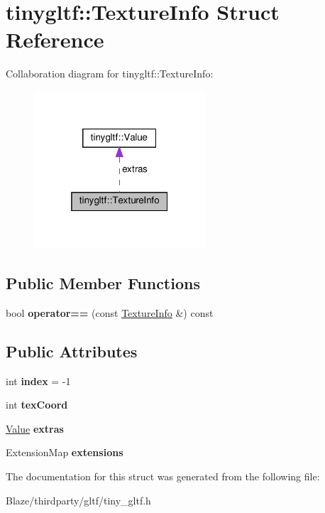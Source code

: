 \hypertarget{structtinygltf_1_1TextureInfo}{}\section{tinygltf\+:\+:Texture\+Info Struct Reference}
\label{structtinygltf_1_1TextureInfo}


Collaboration diagram for tinygltf\+:\+:Texture\+Info\+:\nopagebreak
\begin{figure}[H]
\begin{center}
\leavevmode
\includegraphics[width=181pt]{structtinygltf_1_1TextureInfo__coll__graph}
\end{center}
\end{figure}
\subsection*{Public Member Functions}
\begin{DoxyCompactItemize}
\item 
\mbox{\label{structtinygltf_1_1TextureInfo_aa30003e39bf6378f30901c607537008f}} 
bool {\bfseries operator==} (const \hyperlink{structtinygltf_1_1TextureInfo}{Texture\+Info} \&) const
\end{DoxyCompactItemize}
\subsection*{Public Attributes}
\begin{DoxyCompactItemize}
\item 
\mbox{\label{structtinygltf_1_1TextureInfo_ada6724d5e04b193d229ca9169c251b3d}} 
int {\bfseries index} = -\/1
\item 
\mbox{\label{structtinygltf_1_1TextureInfo_ac61f25915ada851c15c00106dd287c58}} 
int {\bfseries tex\+Coord}
\item 
\mbox{\label{structtinygltf_1_1TextureInfo_a4ce3bd674719cbd822fb133f5d750bf8}} 
\hyperlink{classtinygltf_1_1Value}{Value} {\bfseries extras}
\item 
\mbox{\label{structtinygltf_1_1TextureInfo_a959ce2266edef8456d31cef24199fa3e}} 
Extension\+Map {\bfseries extensions}
\end{DoxyCompactItemize}


The documentation for this struct was generated from the following file\+:\begin{DoxyCompactItemize}
\item 
Blaze/thirdparty/gltf/tiny\+\_\+gltf.\+h\end{DoxyCompactItemize}
